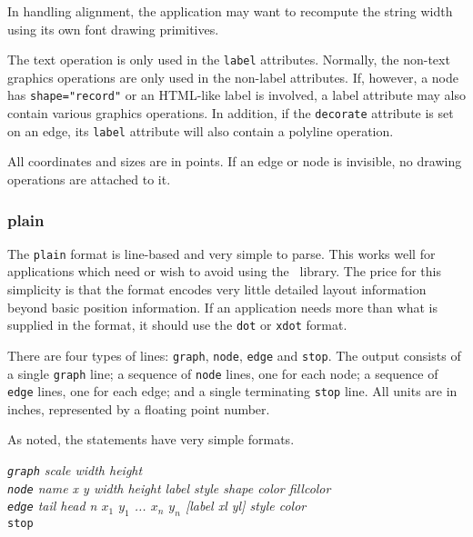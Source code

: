 In handling alignment, the application may want to recompute the string 
width using its own font drawing primitives. 

The text operation is only used in the {\tt label} attributes. 
Normally, the non-text graphics 
operations are only used in the non-label attributes.
If, however, a node has {\tt shape="record"} or an HTML-like label is
involved, a label attribute may also contain various graphics operations.
In addition, if the {\tt decorate} attribute is set on an edge, its 
{\tt label} attribute will also contain a polyline operation. 

All coordinates and sizes are in points.
If an edge or 
node is invisible, no drawing operations are attached to it.

\subsubsection{plain}

The {\tt plain} format is line-based and very simple to parse. This works
well for applications which need or wish to avoid using the \graph\
library. The price for this simplicity is that the format
encodes very little detailed layout information beyond basic position
information. If an application needs more than what is supplied in the
format, it should use the {\tt dot} or {\tt xdot} format.

There are four types of lines: {\tt graph}, {\tt node}, 
{\tt edge} and {\tt stop}. The output
consists of a single {\tt graph} line; a sequence of {\tt node} lines, one
for each node; a sequence of {\tt edge} lines, one for each edge; and
a single terminating {\tt stop} line. All units are in inches,
represented by a floating point number. 

As noted, the statements have very simple formats.
\begin{tabbing}
\indent \indent \= {\em {\tt graph} scale width height} \\
        \> {\em {\tt node} name x y width height label style shape color fillcolor} \\
        \> {\em {\tt edge} tail head n $x_1$ $y_1$ ... $x_n$ $y_n$ [label xl yl] style color} \\
        \> {\tt stop}
\end{tabbing}
       
